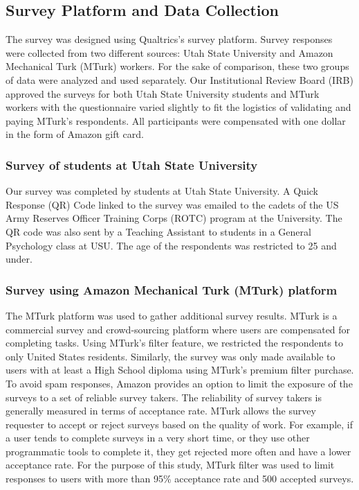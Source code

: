 \documentclass[conference]{IEEEtran}
\begin{document}
\subsection{Survey Platform and Data Collection}\label{subsec2}
The survey was designed using Qualtrics’s survey platform. Survey responses were collected from two different sources: Utah State University and Amazon Mechanical Turk (MTurk) workers. For the sake of comparison, these two groups of data were analyzed and used separately. Our Institutional Review Board (IRB) approved the surveys for both Utah State University students and MTurk workers with the questionnaire varied slightly to fit the logistics of validating and paying MTurk’s respondents. All participants were compensated with one dollar in the form of Amazon gift card.

\subsubsection{Survey of students at Utah State University}\label{subsubsec2}
Our survey was completed by students at Utah State University. A Quick Response (QR) Code linked to the survey was emailed to the cadets of the US Army Reserves Officer Training Corps (ROTC) program at the University. The QR code was also sent by a Teaching Assistant to students in a General Psychology class at USU. The age of the respondents was restricted to 25 and under.

\subsubsection{Survey using Amazon Mechanical Turk (MTurk) platform}\label{subsubsec2}
The MTurk platform was used to gather additional survey results. MTurk is a commercial survey and crowd-sourcing platform where users are compensated for completing tasks. Using MTurk’s filter feature, we restricted the respondents to only United States residents. Similarly, the survey was only made available to users with at least a High School diploma using MTurk’s premium filter purchase. To avoid spam responses, Amazon provides an option to limit the exposure of the surveys to a set of reliable survey takers. The reliability of survey takers is generally measured in terms of acceptance rate. MTurk allows the survey requester to accept or reject surveys based on the quality of work. For example, if a user tends to complete surveys in a very short time, or they use other programmatic tools to complete it, they get rejected more often and have a lower acceptance rate. For the purpose of this study, MTurk filter was used
to limit responses to users with more than 95\% acceptance rate and 500 accepted surveys.
\end{document}
